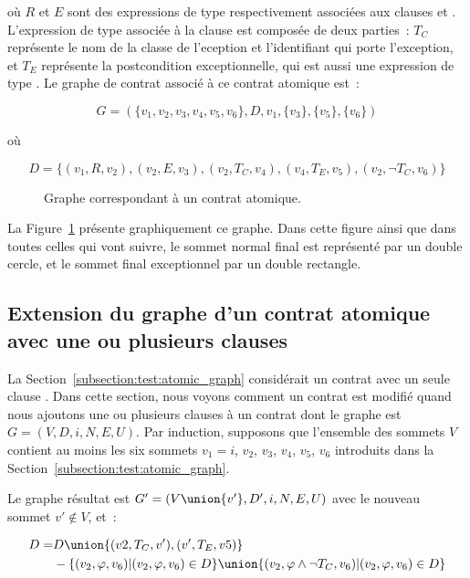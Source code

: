 où $R$ et $E$ sont des expressions de type  respectivement
associées aux clauses \arequires et \aensures. L'expression de type
 associée à la clause \athrowable est composée de
deux parties~: $T_C$ représente le nom de la classe de l'eception et
l'identifiant qui porte l'exception, et $T_E$ représente la postcondition
exceptionnelle, qui est aussi une expression de type . Le
graphe de contrat associé à ce contrat atomique est~:

$$G = (
  \{v_1, v_2, v_3, v_4, v_5, v_6\},
  D,
  v_1,
  \{v_3\},
  \{v_5\},
  \{v_6\}
)$$

où

$$D = \{
  (v_1, R, v_2),
  (v_2, E, v_3),
  (v_2, T_C, v_4),
  (v_4, T_E, v_5),
  (v_2, \neg T_C, v_6)
\}$$

\begin{figure}


\caption{\label{figure:test:atomic_graph} Graphe correspondant à un contrat
atomique.}

\end{figure}

La Figure~\ref{figure:test:atomic_graph} présente graphiquement ce graphe. Dans
cette figure ainsi que dans toutes celles qui vont suivre, le sommet normal
final est représenté par un double cercle, et le sommet final exceptionnel par
un double rectangle.

\subsection{Extension du graphe d'un contrat atomique avec une ou plusieurs
clauses \athrowable}
\label{subsection:test:throwable_graph}

La Section~\ref{subsection:test:atomic_graph} considérait un contrat avec un
seule clause \athrowable. Dans cette section, nous voyons comment un contrat est
modifié quand nous ajoutons une ou plusieurs clauses  à un contrat dont le graphe est $G = (V, D, i, N, E, U)$. Par
induction, supposons que l'ensemble des sommets $V$ contient au moins les six
sommets $v_1 = i$, $v_2$, $v_3$, $v_4$, $v_5$, $v_6$ introduits dans la
Section~\ref{subsection:test:atomic_graph}.

Le graphe résultat est $G' = (V \union \{v'\}, D', i, N, E, U)$ avec le nouveau
sommet $v' \notin V$, et~:

\begin{equation*}
\centering
\begin{aligned}
D = & D \union \{(v2, T_C, v'), (v', T_E, v5)\} \\
    & - \{(v_2, \varphi, v_6) \vert (v_2, \varphi, v_6) \in D\} \union
      \{(v_2, \varphi \land \neg T_C, v_6) \vert (v_2, \varphi, v_6) \in D\}
\end{aligned}
\end{equation*}

